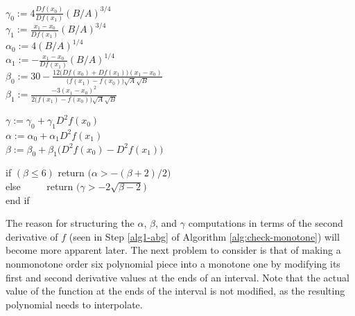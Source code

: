 \documentclass{scspaperproc}
\theoremstyle{scsthe}
\begin{document}
{  \item $\displaystyle \gamma_0 := 4 \frac{Df(x_0)}{Df(x_1)} (B/A)^{3/4}$
    \\ $\displaystyle \gamma_1 := \frac{x_1 - x_0}{Df(x_1)} (B/A)^{3/4}$
    \\ $\alpha_0 := 4 (B/A)^{1/4}$
    \\ $\displaystyle \alpha_1 := -\frac{x_1 - x_0}{Df(x_1)} (B/A)^{1/4}$
    \\ $\displaystyle \beta_0 := 30 - \frac{12 \big(Df(x_0) + Df(x_1)\big) (x_1 - x_0)}{\big(f(x_1) - f(x_0)\big) \sqrt{A}\sqrt{B}}$
    \\ $\displaystyle \beta_1 := \frac{-3 (x_1 - x_0)^2}{2 \big(f(x_1) - f(x_0)\big) \sqrt{A} \sqrt{B}} $ \label{alg1-linearized-abg}
  \item $\gamma := \gamma_0 + \gamma_1 D^2f(x_0)$
    \\ $\alpha := \alpha_0 + \alpha_1 D^2f(x_1)$
    \\ $\beta := \beta_0 + \beta_1 \big(D^2f(x_0) - D^2f(x_1)\big)$
    \label{alg1-abg}
  \item if $(\beta \leq 6)$ return $\big(\alpha > - (\beta + 2) / 2\big)$
    \\ else $\qquad$ return $\big(\gamma > -2 \sqrt{\beta - 2}\big)$
    \\ end if \label{alg1-last}
}

The reason for structuring the $\alpha$, $\beta$, and $\gamma$ computations in terms of the second derivative of $f$ (seen in Step \ref{alg1-abg} of Algorithm \ref{alg:check-monotone}) will become more apparent later. The next problem to consider is that of making a nonmonotone order six polynomial piece into a monotone one by modifying its first and second derivative values at the ends of an interval. Note that the actual value of the function at the ends of the interval is not modified, as the resulting polynomial needs to interpolate.
\end{document}
